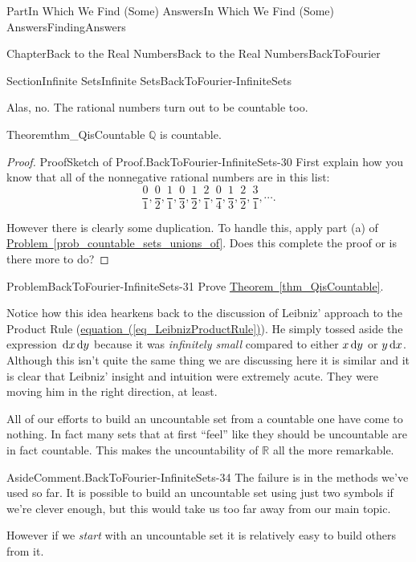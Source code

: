 \documentclass[oneside,10pt,]{book}
\newcommand{\xreffont}{\relax}
\numberwithin{equation}{part}
\newcommand{\dx}[1]{\,{\rm d}#1}
\newcommand{\RR}{\mathbb {R}}
\newcommand{\QQ}{\mathbb {Q}}
\begin{document}
\begin{partptx}{Part}{In Which We Find (Some) Answers}{}{In Which We Find (Some) Answers}{}{}{FindingAnswers}
\begin{chapterptx}{Chapter}{Back to the Real Numbers}{}{Back to the Real Numbers}{}{}{BackToFourier}
\begin{sectionptx}{Section}{Infinite Sets}{}{Infinite Sets}{}{}{BackToFourier-InfiniteSets}
\par
Alas, no.  The rational numbers turn out to be countable too.%
\begin{theorem}{Theorem}{}{}{thm_QisCountable}%
\index{\(\QQ\)!is countable}%
\(\QQ\) is countable.%
\end{theorem}
\begin{proof}{Proof}{Sketch of Proof.}{BackToFourier-InfiniteSets-30}
First explain how you know that all of the non\textendash{}negative rational numbers are in this list:%
\begin{equation*}
\frac{0}{1},\frac{0}{2},\frac{1}{1},\frac{0}{3},
\frac{1}{2},\frac{2}{1},\frac{0}{4},\frac{1}{3}, \frac{2}{2},
\frac{3}{1}, \cdots \text{.}
\end{equation*}
%
\par
However there is clearly some duplication.  To handle this, apply part (a) of \hyperref[prob_countable_sets_unions_of]{Problem~{\xreffont\ref{prob_countable_sets_unions_of}}}.  Does this complete the proof or is there more to do?%
\end{proof}
\begin{problem}{Problem}{}{BackToFourier-InfiniteSets-31}%
Prove \hyperref[thm_QisCountable]{Theorem~{\xreffont\ref{thm_QisCountable}}}.%
\end{problem}
 Notice how this idea hearkens back to the discussion of Leibniz'  approach to the Product Rule (\hyperref[eq_LeibnizProductRule]{equation~({\xreffont\ref{eq_LeibnizProductRule}})}).  He simply tossed aside the expression \(\dx{ x}\dx{ y}\) because it was \emph{infinitely small} compared to either \(x\dx{ y}\) or \(y\dx{ x}\).  Although this isn't quite the same thing we are discussing here it is similar and it is clear that Leibniz' insight and intuition were extremely acute.  They were moving him in the right direction, at least.%
\par
All of our efforts to build an uncountable set from a countable one have come to nothing.  In fact many sets that at first ``feel'' like they should be uncountable are in fact countable. This makes the uncountability of \(\RR\) all the more remarkable.%
\begin{aside}{Aside}{Comment.}{BackToFourier-InfiniteSets-34}%
The failure is in the methods we've used so far.  It is possible to build an uncountable set using just two symbols if we're clever enough, but this would take us too far away from our main topic.%
\end{aside}
However if we \emph{start} with an uncountable set it is relatively easy to build others from it.%

\end{sectionptx}
\end{chapterptx}
\end{partptx}
\end{document}
